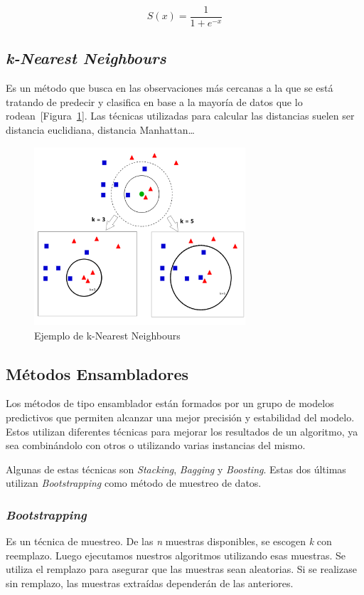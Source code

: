 \begin{equation}
    \label{eq:sigmoide}
    S(x) = \frac{1}{1+e^{-x}}
\end{equation}

\subsection{\textit{k-Nearest Neighbours}}
\label{sec:kn}
Es un método que busca en las observaciones más cercanas a la que se está tratando de predecir y clasifica en base a la mayoría de datos que lo rodean~[Figura~\ref{fig:k_n}]. Las técnicas utilizadas para calcular las distancias suelen ser distancia euclidiana, distancia Manhattan\dots

\begin{figure}[!h]
    \centering
    \includegraphics[width=0.7\textwidth, keepaspectratio]{imaxes/KnnClassification.png}
    \caption{Ejemplo de k-Nearest Neighbours}
    \label{fig:k_n}
\end{figure}

\subsection{Métodos Ensambladores}
Los métodos de tipo ensamblador están formados por un grupo de modelos predictivos que permiten alcanzar una mejor precisión y estabilidad del modelo. Estos utilizan diferentes técnicas para mejorar los resultados de un algoritmo, ya sea combinándolo con otros o utilizando varias instancias del mismo. 

Algunas de estas técnicas son \textit{Stacking}, \textit{Bagging} y \textit{Boosting}. Estas dos últimas utilizan \textit{Bootstrapping} como método de muestreo de datos.

\subsubsection{\textit{Bootstrapping}}
Es un técnica de muestreo. De las \textit{n} muestras disponibles, se escogen \textit{k} con reemplazo. Luego ejecutamos nuestros algoritmos utilizando esas muestras. Se utiliza el remplazo para asegurar que las muestras sean aleatorias. Si se realizase sin remplazo, las muestras extraídas dependerán de las anteriores.

